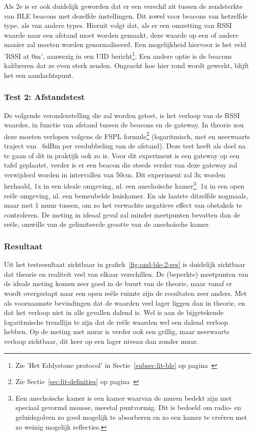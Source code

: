 Als 2e is er ook duidelijk geworden dat er een verschil zit tussen de zendsterkte van BLE beacons met dezelfde instellingen. Dit zowel voor beacons van hetzelfde type, als van andere types. Hieruit volgt dat, als er een omzetting van RSSI waarde naar een afstand moet worden gemaakt, deze waarde op een of andere manier zal moeten worden genormaliseerd. Een mogelijkheid hiervoor is het veld 'RSSI at 0m', aanwezig in een UID bericht\footnote{Zie 'Het Eddystone protocol' in Sectie~\ref{subsec:lit-ble} op pagina~\pageref{subsec:lit-ble}}. Een andere optie is de beacons kalibreren dat ze even sterk zenden. Ongeacht hoe hier rond wordt gewerkt, blijft het een aandachtspunt.

\subsubsection{Test 2: Afstandstest}
\label{sec:ond-ble-0-2}
De volgende veronderstelling die zal worden getest, is het verloop van de RSSI waardes, in functie van afstand tussen de beacons en de gateway. In theorie zou deze moeten verlopen volgens de FSPL formule\footnote{Zie Sectie~\ref{sec:lit-definities} op pagina~\pageref{sec:lit-definities}} (logaritmisch, met en neerwaarts traject van ~6dBm per verdubbeling van de afstand). Deze test heeft als doel na te gaan of dit in praktijk ook zo is.
Voor dit experiment is een gateway op een tafel geplaatst, verder is er een beacon die steeds verder van deze gateway zal verwijderd worden in intervallen van 50cm. Dit experiment zal 3x worden herhaald, 1x in een ideale omgeving, nl. een anechoïsche kamer\footnote{Een anechoïsche kamer is een kamer waarvan de muren bedekt zijn met speciaal gevormd mousse, meestal puntvormig. Dit is bedoeld om radio- en geluidsgolven zo goed mogelijk te absorberen en zo een kamer te creëren met zo weinig mogelijk reflecties.}. 1x in een open reële omgeving, nl. een bemeubelde huiskamer. En als laatste ditzelfde nogmaals, maar met 1 muur tussen, om zo het verwachte negatieve effect van obstakels te controleren. De meting in ideaal geval zal minder meetpunten bevatten dan de reële, omwille van de gelimiteerde grootte van de anechoïsche kamer.

\subsubsection{Resultaat}
Uit het testresultaat zichtbaar in grafiek~\ref{fig:ond-ble-2-res} is duidelijk zichtbaar dat theorie en realiteit veel van elkaar verschillen. De (beperkte) meetpunten van de ideale meting komen zeer goed in de buurt van de theorie, maar vanaf er wordt overgestapt naar een open reële ruimte zijn de resultaten zeer anders. Met als voornaamste bevindingen dat de waarden veel lager liggen dan in theorie, en dat het verloop niet in alle gevallen dalend is. Wel is aan de bijgetekende logaritmische trendlijn te zijn dat de reële waarden wel een dalend verloop hebben. Op de meting met muur is verder ook een grillig, maar neerwaarts verloop zichtbaar, dit keer op een lager niveau dan zonder muur.


